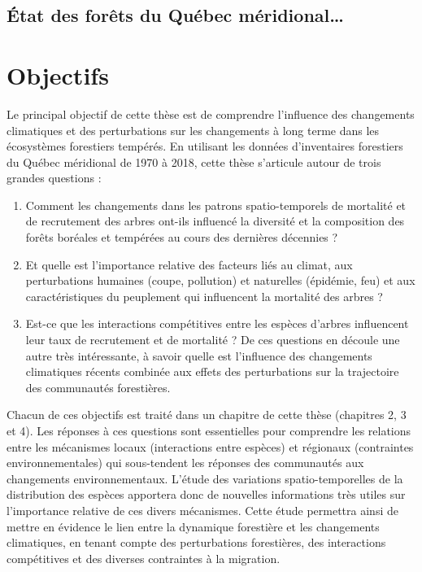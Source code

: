 \documentclass[
]{article}
\begin{document}
\hypertarget{uxe9tat-des-foruxeats-du-quuxe9bec-muxe9ridional}{%
\subsection{État des forêts du Québec
méridional\ldots{}}\label{uxe9tat-des-foruxeats-du-quuxe9bec-muxe9ridional}}

\hypertarget{objectifs}{%
\section{Objectifs}\label{objectifs}}

Le principal objectif de cette thèse est de comprendre l'influence des
changements climatiques et des perturbations sur les changements à long
terme dans les écosystèmes forestiers tempérés. En utilisant les données
d'inventaires forestiers du Québec méridional de 1970 à 2018, cette
thèse s'articule autour de trois grandes questions :

\begin{enumerate}
\def\labelenumi{(\arabic{enumi})}
\item
  Comment les changements dans les patrons spatio-temporels de mortalité
  et de recrutement des arbres ont-ils influencé la diversité et la
  composition des forêts boréales et tempérées au cours des dernières
  décennies ?
\item
  Et quelle est l'importance relative des facteurs liés au climat, aux
  perturbations humaines (coupe, pollution) et naturelles (épidémie,
  feu) et aux caractéristiques du peuplement qui influencent la
  mortalité des arbres ?
\item
  Est-ce que les interactions compétitives entre les espèces d'arbres
  influencent leur taux de recrutement et de mortalité ? De ces
  questions en découle une autre très intéressante, à savoir quelle est
  l'influence des changements climatiques récents combinée aux effets
  des perturbations sur la trajectoire des communautés forestières.
\end{enumerate}

Chacun de ces objectifs est traité dans un chapitre de cette thèse
(chapitres 2, 3 et 4). Les réponses à ces questions sont essentielles
pour comprendre les relations entre les mécanismes locaux (interactions
entre espèces) et régionaux (contraintes environnementales) qui
sous-tendent les réponses des communautés aux changements
environnementaux. L'étude des variations spatio-temporelles de la
distribution des espèces apportera donc de nouvelles informations très
utiles sur l'importance relative de ces divers mécanismes. Cette étude
permettra ainsi de mettre en évidence le lien entre la dynamique
forestière et les changements climatiques, en tenant compte des
perturbations forestières, des interactions compétitives et des diverses
contraintes à la migration.
\end{document}
